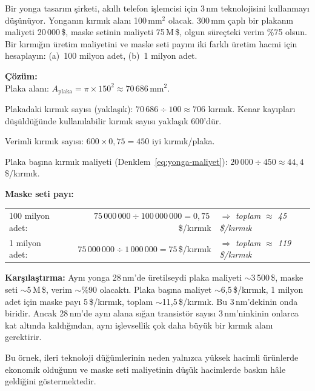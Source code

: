 \begin{ornek}[1.2]
Bir yonga tasarım şirketi, akıllı telefon işlemcisi için 3\,nm teknolojisini kullanmayı düşünüyor. Yonganın kırmık alanı 100\,mm$^2$ olacak. 300\,mm çaplı bir plakanın maliyeti 20\,000\,\$, maske setinin maliyeti 75\,M\,\$, olgun süreçteki verim \%75 olsun. Bir kırmığın üretim maliyetini ve maske seti payını iki farklı üretim hacmi için hesaplayın: (a)~100 milyon adet, (b)~1 milyon adet.

\textbf{Çözüm:}\\
Plaka alanı: $A_\text{plaka} = \pi \times 150^2 \approx 70\,686$\,mm$^2$.

Plakadaki kırmık sayısı (yaklaşık): $70\,686 \div 100 \approx 706$ kırmık. Kenar kayıpları düşüldüğünde kullanılabilir kırmık sayısı yaklaşık 600'dür.

Verimli kırmık sayısı: $600 \times 0{,}75 = 450$ iyi kırmık/plaka.

Plaka başına kırmık maliyeti (Denklem~\ref{eq:yonga-maliyet}): $20\,000 \div 450 \approx 44{,}4$\,\$/kırmık.

\medskip
\textbf{Maske seti payı:}

\smallskip
\begin{tabular}{@{}lrl@{}}
100 milyon adet: & $75\,000\,000 \div 100\,000\,000 = 0{,}75$\,\$/kırmık & $\Rightarrow$ \emph{toplam $\approx$ 45\,\$/kırmık} \\[4pt]
1 milyon adet:   & $75\,000\,000 \div 1\,000\,000 = 75$\,\$/kırmık     & $\Rightarrow$ \emph{toplam $\approx$ 119\,\$/kırmık}
\end{tabular}

\medskip
\textbf{Karşılaştırma:} Aynı yonga 28\,nm'de üretilseydi plaka maliyeti ${\sim}$3\,500\,\$, maske seti ${\sim}$5\,M\,\$, verim ${\sim}$\%90 olacaktı. Plaka başına maliyet ${\sim}$6{,}5\,\$/kırmık, 1 milyon adet için maske payı 5\,\$/kırmık, toplam ${\sim}$11{,}5\,\$/kırmık. Bu 3\,nm'dekinin onda biridir. Ancak 28\,nm'de aynı alana sığan transistör sayısı 3\,nm'ninkinin onlarca kat altında kaldığından, aynı işlevsellik çok daha büyük bir kırmık alanı gerektirir.

Bu örnek, ileri teknoloji düğümlerinin neden yalnızca yüksek hacimli ürünlerde ekonomik olduğunu ve maske seti maliyetinin düşük hacimlerde baskın hâle geldiğini göstermektedir.
\end{ornek}

